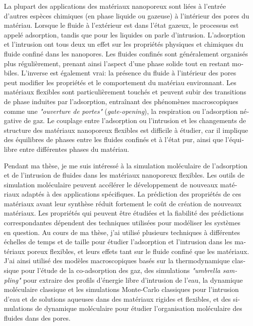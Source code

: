 \documentclass[thesis]{subfiles}
\begin{document}
\begin{otherlanguage}{french}
La plupart des applications des matériaux nanoporeux sont liées à l'entrée
d'autres espèces chimiques (en phase liquide ou gazeuse) à l'intérieur des pores
du matériau. Lorsque le fluide à l'extérieur est dans l'état gazeux, le
processus est appelé adsorption, tandis que pour les liquides on parle
d'intrusion. L'adsorption et l'intrusion ont tous deux un effet sur les
propriétés physiques et chimiques du fluide confiné dans les nanopores. Les
fluides confinés sont généralement organisés plus régulièrement, prenant ainsi
l'aspect d'une phase solide tout en restant mobiles. L'inverse est également
vrai: la présence du fluide à l'intérieur des pores peut modifier les propriétés
et le comportement du matériau environnant. Les matériaux flexibles sont
particulièrement touchés et peuvent subir des transitions de phase induites par
l'adsorption, entraînant des phénomènes macroscopiques comme une
\emph{"ouverture de portes"} (\emph{gate-opening}), la respiration ou
l'adsorption négative de gaz. Le couplage entre l'adsorption ou l'intrusion et
les changements de structure des matériaux nanoporeux flexibles est difficile à
étudier, car il implique des équilibres de phases entre les fluides confinés et
à l'état pur, ainsi que l'équilibre entre différentes phases du matériau.

Pendant ma thèse, je me suis intéressé à la simulation moléculaire de
l'adsorption et de l'intrusion de fluides dans les matériaux nanoporeux
flexibles. Les outils de simulation moléculaire peuvent accélérer le
développement de nouveaux matériaux adaptés à des applications spécifiques. La
prédiction des propriétés de ces matériaux avant leur synthèse réduit
fortement le coût de création de nouveaux matériaux. Les propriétés qui peuvent
être étudiées et la fiabilité des prédictions correspondantes dépendent des
techniques utilisées pour modéliser les systèmes en question. Au cours de ma
thèse, j'ai utilisé plusieurs techniques à différentes échelles de temps et de
taille pour étudier l'adsorption et l'intrusion dans les matériaux poreux
flexibles, et leurs effets tant sur le fluide confiné que les matériaux. J'ai
ainsi utilisé des modèles macroscopiques basés sur la thermodynamique classique
pour l'étude de la co-adsorption des gaz, des simulations \emph{"umbrella
sampling"} pour extraire des profils d'énergie libre d'intrusion de l'eau, la
dynamique moléculaire classique et les simulations Monte-Carlo classiques pour
l'intrusion d'eau et de solutions aqueuses dans des matériaux rigides et
flexibles, et des simulations de dynamique moléculaire \abinitio pour étudier
l'organisation moléculaire des fluides dans des pores.


\end{otherlanguage}
\end{document}
